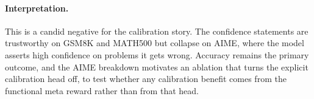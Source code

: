 \paragraph{Interpretation.} This is a candid negative for the calibration story.
The confidence statements are trustworthy on GSM8K and MATH500 but collapse on
AIME, where the model asserts high confidence on problems it gets wrong. Accuracy
remains the primary outcome, and the AIME breakdown motivates an ablation that
turns the explicit calibration head off, to test whether any calibration benefit
comes from the functional meta reward rather than from that head.

